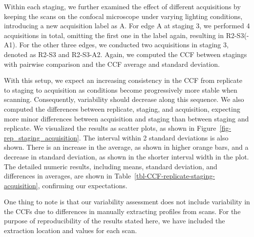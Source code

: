 \documentclass[fleqn,10pt]{wlscirep}
\begin{document}
Within each staging, we further examined the effect of different
acquisitions by keeping the scans on the confocal microscope under
varying lighting conditions, introducing a new acquisition label as A.
For edge A at staging 3, we performed 4 acquisitions in total, omitting
the first one in the label again, resulting in R2-S3(-A1). For the other
three edges, we conducted two acquisitions in staging 3, denoted as
R2-S3 and R2-S3-A2. Again, we computed the CCF between stagings with
pairwise comparison and the CCF average and standard deviation.

With this setup, we expect an increasing consistency in the CCF from
replicate to staging to acquisition as conditions become progressively
more stable when scanning. Consequently, variability should decrease
along this sequence. We also computed the differences between replicate,
staging, and acquisition, expecting more minor differences between
acquisition and staging than between staging and replicate. We
visualized the results as scatter plots, as shown in
Figure~\ref{fig-rep_staging_acquisition}. The interval within 2 standard
deviations is also shown. There is an increase in the average, as shown
in higher orange bars, and a decrease in standard deviation, as shown in
the shorter interval width in the plot. The detailed numeric results,
including means, standard deviation, and differences in averages, are
shown in Table~\ref{tbl-CCF-replicate-staging-acquisition}, confirming
our expectations.

One thing to note is that our variability assessment does not include
variability in the CCFs due to differences in manually extracting
profiles from scans. For the purpose of reproducibility of the results
stated here, we have included the extraction location and values for
each scan.
\end{document}
